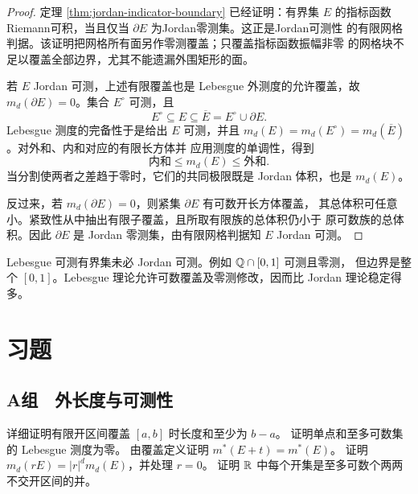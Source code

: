 \begin{proof}
定理 \ref{thm:jordan-indicator-boundary} 已经证明：有界集 $E$ 的指标函数
Riemann可积，当且仅当 $\partial E$ 为Jordan零测集。这正是Jordan可测性
的有限网格判据。该证明把网格所有面另作零测覆盖；只覆盖指标函数振幅非零
的网格块不足以覆盖全部边界，尤其不能遗漏外围矩形的面。

若 $E$ Jordan 可测，上述有限覆盖也是 Lebesgue 外测度的允许覆盖，故
$m_d(\partial E)=0$。集合 $E^\circ$ 可测，且
\[
 E^\circ\subseteq E\subseteq\overline E
 =E^\circ\cup\partial E.
\]
Lebesgue 测度的完备性于是给出 $E$ 可测，并且
$m_d(E)=m_d(E^\circ)=m_d(\overline E)$。对外和、内和对应的有限长方体并
应用测度的单调性，得到
\[
 \text{内和}\le m_d(E)\le\text{外和}.
\]
当分割使两者之差趋于零时，它们的共同极限既是 Jordan 体积，也是
$m_d(E)$。

反过来，若 $m_d(\partial E)=0$，则紧集 $\partial E$ 有可数开长方体覆盖，
其总体积可任意小。紧致性从中抽出有限子覆盖，且所取有限族的总体积仍小于
原可数族的总体积。因此 $\partial E$ 是 Jordan 零测集，由有限网格判据知
$E$ Jordan 可测。
\end{proof}

Lebesgue 可测有界集未必 Jordan 可测。例如 $\mathbb{Q}\cap[0,1]$ 可测且零测，
但边界是整个 $[0,1]$。Lebesgue 理论允许可数覆盖及零测修改，因而比
Jordan 理论稳定得多。

\section*{习题}

\subsection*{A组　外长度与可测性}
\begin{enumerate}[label=\textbf{\thechapter.\arabic*.}]
 详细证明有限开区间覆盖 $[a,b]$ 时长度和至少为 $b-a$。
 证明单点和至多可数集的 Lebesgue 测度为零。
 由覆盖定义证明 $m^*(E+t)=m^*(E)$。
 证明 $m_d(rE)=|r|^dm_d(E)$，并处理 $r=0$。
 证明 $\mathbb{R}$ 中每个开集是至多可数个两两不交开区间的并。
\end{enumerate}

